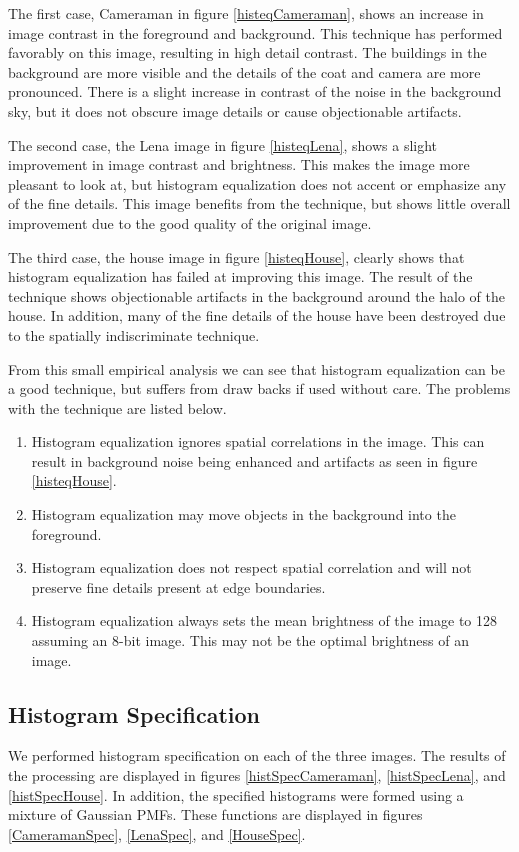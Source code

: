 \documentclass[journal]{IEEEtran}
\begin{document}
\par The first case, Cameraman in figure \ref{histeqCameraman}, shows an increase in image contrast in the foreground and background. This technique has performed favorably on this image, resulting in high detail contrast. The buildings in the background are more visible and the details of the coat and camera are more pronounced. There is a slight increase in contrast of the noise in the background sky, but it does not obscure image details or cause objectionable artifacts.
\par The second case, the Lena image in figure \ref{histeqLena}, shows a slight improvement in image contrast and brightness. This makes the image more pleasant to look at, but histogram equalization does not accent or emphasize any of the fine details. This image benefits from the technique, but shows little overall improvement due to the good quality of the original image.
\par The third case, the house image in figure \ref{histeqHouse}, clearly shows that histogram equalization has failed at improving this image. The result of the technique shows objectionable artifacts in the background around the halo of the house.  In addition, many of the fine details of the house have been destroyed due to the spatially indiscriminate technique.
\par From this small empirical analysis we can see that histogram equalization can be a good technique, but suffers from draw backs if used without care. The problems with the technique are listed below.

\begin{enumerate}
\item Histogram equalization ignores spatial correlations in the image. This can result in background noise being enhanced and artifacts as seen in figure \ref{histeqHouse}.
\item Histogram equalization may move objects in the background into the foreground.
\item Histogram equalization does not respect spatial correlation and will not preserve fine details present at edge boundaries.
\item Histogram equalization always sets the mean brightness of the image to 128 assuming an 8-bit image. This may not be the optimal brightness of an image.

\end{enumerate}

\subsection{Histogram Specification}
We performed histogram specification on each of the three images. The results of the processing are displayed in figures \ref{histSpecCameraman}, \ref{histSpecLena}, and \ref{histSpecHouse}. In addition, the specified histograms were formed using a mixture of Gaussian PMFs. These functions are displayed in figures \ref{CameramanSpec}, \ref{LenaSpec}, and \ref{HouseSpec}.
\end{document}
